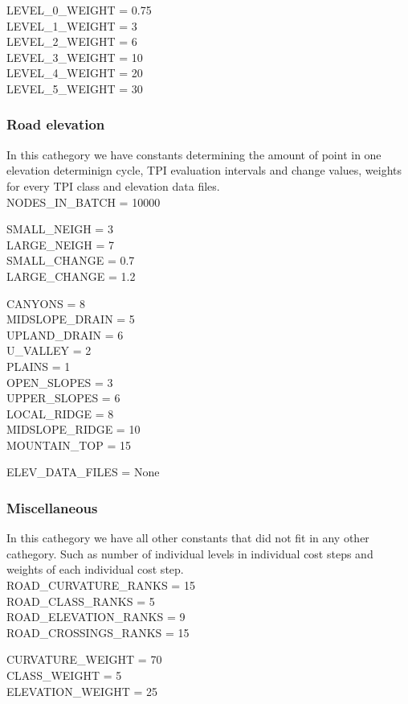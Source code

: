 \documentclass[oneside]{article}
\begin{document}
            \vspace{5mm}

            \noindent LEVEL\_0\_WEIGHT = 0.75\\
            LEVEL\_1\_WEIGHT = 3\\
            LEVEL\_2\_WEIGHT = 6\\
            LEVEL\_3\_WEIGHT = 10\\
            LEVEL\_4\_WEIGHT = 20\\
            LEVEL\_5\_WEIGHT = 30

            \subsubsection{Road elevation}
            In this cathegory we have constants determining the amount of point in one elevation determinign cycle, TPI evaluation intervals and change values, weights for every TPI class and elevation data files.\\
            NODES\_IN\_BATCH = 10000

            \vspace{5mm}

            \noindent SMALL\_NEIGH = 3\\
            LARGE\_NEIGH = 7\\
            SMALL\_CHANGE = 0.7\\
            LARGE\_CHANGE = 1.2

            \vspace{5mm}

            \noindent CANYONS = 8\\
            MIDSLOPE\_DRAIN = 5\\
            UPLAND\_DRAIN = 6\\
            U\_VALLEY = 2\\
            PLAINS = 1\\
            OPEN\_SLOPES = 3\\
            UPPER\_SLOPES = 6\\
            LOCAL\_RIDGE = 8\\
            MIDSLOPE\_RIDGE = 10\\
            MOUNTAIN\_TOP = 15

            \vspace{5mm}

            \noindent ELEV\_DATA\_FILES = None

            \subsubsection{Miscellaneous}
            In this cathegory we have all other constants that did not fit in any other cathegory. Such as number of individual levels in individual cost steps and weights of each individual cost step.\\
            ROAD\_CURVATURE\_RANKS = 15\\
            ROAD\_CLASS\_RANKS = 5\\
            ROAD\_ELEVATION\_RANKS = 9\\
            ROAD\_CROSSINGS\_RANKS = 15

            \vspace{5mm}

            \noindent CURVATURE\_WEIGHT = 70\\
            CLASS\_WEIGHT = 5\\
            ELEVATION\_WEIGHT = 25
\end{document}
